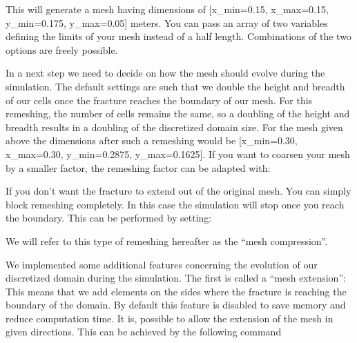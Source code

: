 \documentclass[letterpaper,10pt,english]{sphinxmanual}
\begin{document}
\sphinxAtStartPar
This will generate a mesh having dimensions of {[}x\_min=\sphinxhyphen{}0.15, x\_max=0.15, y\_min=\sphinxhyphen{}0.175, y\_max=0.05{]} meters. You can pass
an array of two variables defining the limits of your mesh instead of a half length. Combinations of the two options are
freely possible.

\sphinxAtStartPar
In a next step we need to decide on how the mesh should evolve during the simulation. The default
settings are such that we double the height and breadth of our cells once the fracture reaches the boundary of our
mesh. For this re\sphinxhyphen{}meshing, the number of cells remains the same, so a doubling of the height and breadth results in a
doubling of the discretized domain size. For the mesh given above the dimensions after such a re\sphinxhyphen{}meshing would be
{[}x\_min=\sphinxhyphen{}0.30, x\_max=0.30, y\_min=\sphinxhyphen{}0.2875, y\_max=0.1625{]}. If you want to coarsen your mesh by a smaller factor, the
re\sphinxhyphen{}meshing factor can be adapted with:

\begin{sphinxVerbatim}[commandchars=\\\{\}]
   

  
  
\end{sphinxVerbatim}

\sphinxAtStartPar
If you don’t want the fracture to extend out of the original mesh. You can simply block re\sphinxhyphen{}meshing completely. In this
case the simulation will stop once you reach the boundary. This can be performed by setting:

\begin{sphinxVerbatim}[commandchars=\\\{\}]
  
\end{sphinxVerbatim}

\sphinxAtStartPar
We will refer to this type of re\sphinxhyphen{}meshing hereafter as the “mesh compression”.

\sphinxAtStartPar
We implemented some additional features concerning the evolution of our discretized domain during the simulation. The
first is called a “mesh extension”: This means that we add elements on the sides where the fracture is reaching the
boundary of the domain. By default this feature is disabled to save memory and reduce computation time. It is, possible
to allow the extension of the mesh in given directions. This can be achieved by the following command
\end{document}
